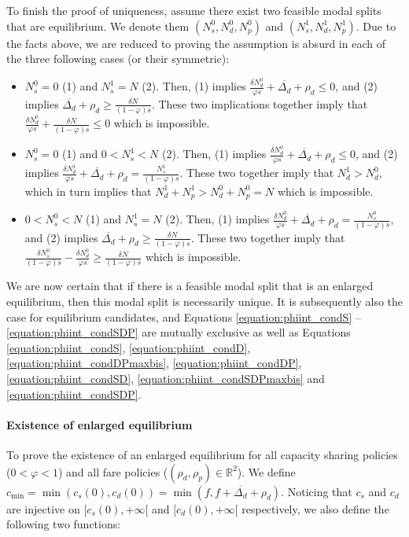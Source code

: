 \documentclass[english, a4paper]{article}
\theoremstyle{plain}
\theoremstyle{definition}
\theoremstyle{remark}
\begin{document}
To finish the proof of uniqueness, assume there exist two feasible modal splits that are equilibrium. We denote them $(N_s^0, N_d^0, N_p^0)$ and $(N_s^1, N_d^1, N_p^1)$. Due to the facts above, we are reduced to proving the assumption is absurd in each of the three following cases (or their symmetric):
\begin{itemize}
    \item $N_s^0 = 0$ (1) and $N_s^1= N$ (2). Then, (1) implies $\frac{\delta N_d^0}{\varphi s} + \overline{\Delta _d} + \rho _d \leq 0$, and (2) implies $\overline{\Delta _d} + \rho _d \geq \frac{\delta N}{(1-\varphi)s}$. These two implications together imply that $\frac{\delta N_d^0}{\varphi s} + \frac{\delta N}{(1-\varphi)s} \leq 0$ which is impossible.

    \item $N_s^0 = 0$ (1) and $0 < N_s^1 < N$ (2). Then, (1) implies $\frac{\delta N_d^0}{\varphi s} + \overline{\Delta _d} + \rho _d \leq 0$, and (2) implies $\frac{\delta N_d^1}{\varphi s} + \overline{\Delta _d} + \rho _d = \frac{N_s^1}{(1-\varphi)s}$. These two together imply that $N_d^1 > N_d^0$, which in turn implies that $N_d^1 + N_p^1 > N_d^0 + N_p^0 = N$ which is impossible.
    \item $0 < N_s^0 < N$ (1) and $N_s^1 = N$ (2). Then, (1) implies $\frac{\delta N_d^0}{\varphi s} + \overline{\Delta _d} + \rho _d = \frac{N_s^0}{(1-\varphi)s}$, and (2) implies $\overline{\Delta _d} + \rho _d \geq \frac{\delta N}{(1-\varphi)s}$. These two together imply that $\frac{\delta N_s^0}{(1-\varphi)s} - \frac{\delta N_d^0}{\varphi s} \geq \frac{\delta N}{(1-\varphi)s}$ which is impossible.
\end{itemize}

We are now certain that if there is a feasible modal split that is an enlarged equilibrium, then this modal split is necessarily unique. It is subsequently also the case for equilibrium candidates, and Equations \ref{equation:phiint_condS} -- \ref{equation:phiint_condSDP} are mutually exclusive as well as Equations \ref{equation:phiint_condS}, \ref{equation:phiint_condD}, \ref{equation:phiint_condDPmaxbis}, \ref{equation:phiint_condDP}, \ref{equation:phiint_condSD}, \ref{equation:phiint_condSDPmaxbis} and \ref{equation:phiint_condSDP}.

\paragraph{Existence of enlarged equilibrium}
To prove the existence of an enlarged equilibrium for all capacity sharing policies ($0 < \varphi < 1$) and all fare policies ($(\rho_d, \rho_p) \in \mathbb{R}^2$). We define $c_{\text{min}} = \min (c_s(0), c_d(0)) = \min (f, f + \overline{\Delta _d} + \rho _d)$. Noticing that $c_s$ and $c_d$ are injective on $[c_s(0), +\infty[$ and $[c_d(0), +\infty[$ respectively, we also define the following two functions:
\end{document}
